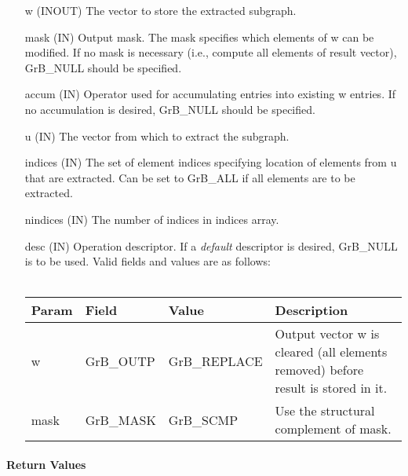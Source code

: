 \begin{itemize}[leftmargin=1in]
    \item[{\sf w}]       ({\sf INOUT}) The vector to store the extracted subgraph.

    \item[{\sf mask}]    ({\sf IN}) Output mask. The mask
    specifies which elements of {\sf w} can be modified.
    If no mask is necessary (i.e., compute all elements of result
    vector), {\sf GrB\_NULL} should be specified.

    \item[{\sf accum}]   ({\sf IN})  Operator used for accumulating entries into existing {\sf w} entries. 
			If no accumulation is desired, {\sf GrB\_NULL} should be specified.

    \item[{\sf u}]       ({\sf IN}) The vector from which to extract the subgraph.
    \item[{\sf indices}] ({\sf IN}) The set of element indices specifying location of
                              elements from {\sf u} that are extracted. Can
                              be set to {\sf GrB\_ALL} if all elements are
                              to be extracted.
    \item[{\sf nindices}] ({\sf IN}) The number of indices in {\sf indices} array.

    \item[{\sf desc}]     ({\sf IN}) Operation descriptor. If a
    \emph{default} descriptor is desired, {\sf GrB\_NULL} is to be
    used.  Valid fields and values are as follows: \\ ~\\
    \begin{tabular}{lllp{2.5in}}
    Param & Field  & Value & Description \\
    \hline
    {\sf w}    & {\sf GrB\_OUTP} & {\sf GrB\_REPLACE} & Output vector {\sf w} is cleared (all elements removed) before result is stored in it. \\
    {\sf mask} & {\sf GrB\_MASK} & {\sf GrB\_SCMP}   & Use the structural complement of {\sf mask}. \\
    \end{tabular}
\end{itemize}

\paragraph{Return Values}


